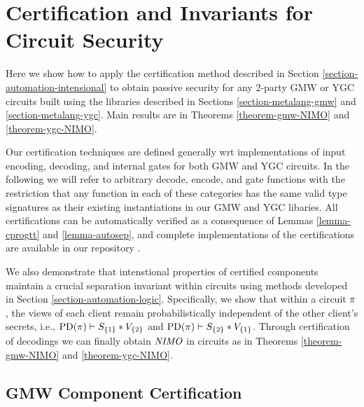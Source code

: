 \section{Certification and Invariants for Circuit Security}
\label{section-composition}

Here we show how to apply the certification method described in
Section \ref{section-automation-intensional} to obtain passive
security for any 2-party GMW or YGC circuits built using the libraries
described in Sections \ref{section-metalang-gmw} and
\ref{section-metalang-ygc}.  Main results are in Theorems
\ref{theorem-gmw-NIMO} and \ref{theorem-ygc-NIMO}.

Our certification techniques are defined generally wrt implementations
of input encoding, decoding, and internal gates for both GMW and YGC
circuits. In the following we will refer to arbitrary decode, encode,
and gate functions with the restriction that any function in each of
these categories has the same valid type signatures as their existing
instantiations in our GMW and YGC libaries. All certifications can be
automatically verified as a consequence of Lemmas \ref{lemma-cprogtt}
and \ref{lemma-autosep}, and complete implementations of the
certifications are available in our repository \cite{jpdf-github}. 

We also demonstrate that intenstional properties of certified
components maintain a crucial separation invariant within circuits
using methods developed in Section \ref{section-automation-logic}.
Specifically, we show that within a circuit $\pi$, the views of each
client remain probabilistically independent of the other client's
secrets, i.e., $\mathrm{PD}(\pi) \vdash S_{\{1\}} * V_{\{2\}}$ and
$\mathrm{PD}(\pi) \vdash S_{\{2\}} * V_{\{1\}}$.
Through certification of decodings we can finally obtain $\mathit{NIMO}$ in
circuits as in Theorems \ref{theorem-gmw-NIMO} and
\ref{theorem-ygc-NIMO}.

\subsection{GMW Component Certification}

